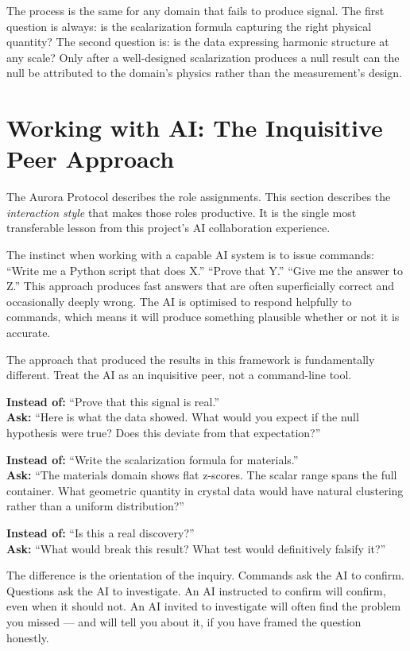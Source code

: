 \documentclass[11pt, letterpaper, openany]{book}
\begin{document}
The process is the same for any domain that fails to produce signal. The first
question is always: is the scalarization formula capturing the right physical quantity?
The second question is: is the data expressing harmonic structure at any scale? Only
after a well-designed scalarization produces a null result can the null be attributed
to the domain's physics rather than the measurement's design.

\section*{Working with AI: The Inquisitive Peer Approach}

The Aurora Protocol describes the role assignments. This section describes the
\emph{interaction style} that makes those roles productive. It is the single most
transferable lesson from this project's AI collaboration experience.

The instinct when working with a capable AI system is to issue commands: ``Write me
a Python script that does X.'' ``Prove that Y.'' ``Give me the answer to Z.'' This
approach produces fast answers that are often superficially correct and occasionally
deeply wrong. The AI is optimised to respond helpfully to commands, which means it
will produce something plausible whether or not it is accurate.

The approach that produced the results in this framework is fundamentally different.
Treat the AI as an inquisitive peer, not a command-line tool.

\textbf{Instead of:} ``Prove that this signal is real.''\\
\textbf{Ask:} ``Here is what the data showed. What would you expect if the null
hypothesis were true? Does this deviate from that expectation?''

\textbf{Instead of:} ``Write the scalarization formula for materials.''\\
\textbf{Ask:} ``The materials domain shows flat z-scores. The scalar range spans the
full container. What geometric quantity in crystal data would have natural clustering
rather than a uniform distribution?''

\textbf{Instead of:} ``Is this a real discovery?''\\
\textbf{Ask:} ``What would break this result? What test would definitively falsify it?''

The difference is the orientation of the inquiry. Commands ask the AI to confirm.
Questions ask the AI to investigate. An AI instructed to confirm will confirm, even
when it should not. An AI invited to investigate will often find the problem you
missed --- and will tell you about it, if you have framed the question honestly.
\end{document}
